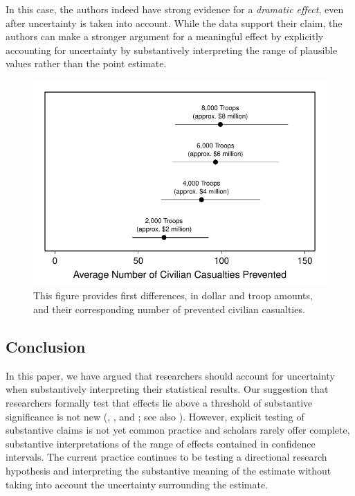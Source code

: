 \documentclass[12pt]{article}
\begin{document}
In this case, the authors indeed have strong evidence for a \emph{dramatic effect}, even after uncertainty is taken into account. While the data support their claim, the authors can make a stronger argument for a meaningful effect by explicitly accounting for uncertainty by substantively interpreting the range of plausible values rather than the point estimate.

\begin{figure}[H]
\begin{center}
\includegraphics[scale = .8]{figs/hks-ci.pdf}
\caption{This figure provides first differences, in dollar and troop amounts, and their corresponding number of prevented civilian casualties.}\label{fig:hks-ci}
\end{center}
\end{figure}


\subsection*{Conclusion}

In this paper, we have argued that researchers should account for uncertainty when substantively interpreting their statistical results. Our suggestion that researchers formally test that effects lie above a threshold of substantive significance is not new (\citealt{Achen1982}, \citealt{Rainey2014}, and \citealt{Gross2014}; see also \citealt{EsareyDanneman2014}). However, explicit testing of substantive claims is not yet common practice and scholars rarely offer complete, substantive interpretations of the range of effects contained in confidence intervals. The current practice continues to be testing a directional research hypothesis and interpreting the substantive meaning of the estimate without taking into account the uncertainty surrounding the estimate. 
\end{document}
